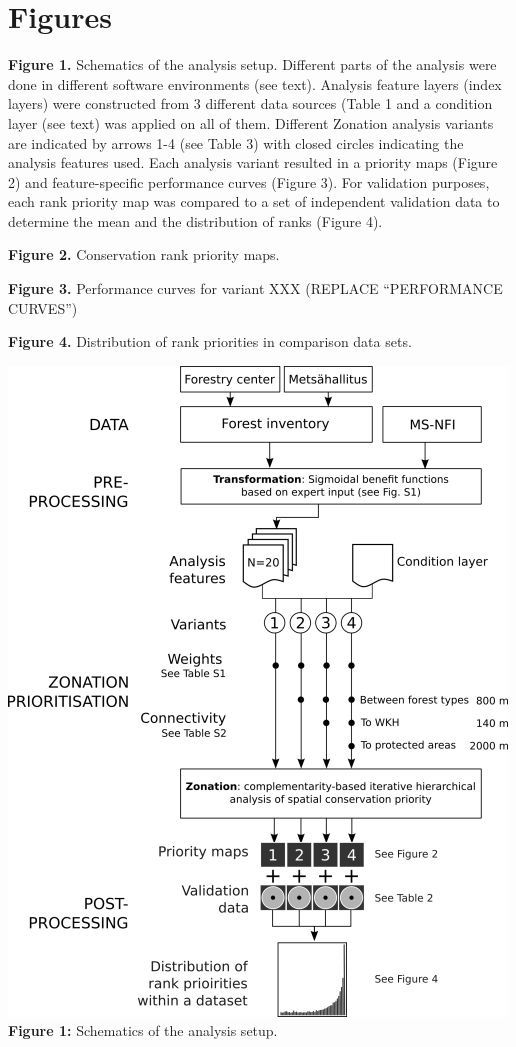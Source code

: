 \section{Figures}

\textbf{Figure 1.} Schematics of the analysis setup. Different parts of
the analysis were done in different software environments (see text).
Analysis feature layers (index layers) were constructed from 3 different
data sources (Table 1 and a condition layer (see text) was applied on
all of them. Different Zonation analysis variants are indicated by
arrows 1-4 (see Table 3) with closed circles indicating the analysis
features used. Each analysis variant resulted in a priority maps (Figure
2) and feature-specific performance curves (Figure 3). For validation
purposes, each rank priority map was compared to a set of independent
validation data to determine the mean and the distribution of ranks
(Figure 4).

\textbf{Figure 2.} Conservation rank priority maps.

\textbf{Figure 3.} Performance curves for variant XXX (REPLACE
``PERFORMANCE CURVES'')

\textbf{Figure 4.} Distribution of rank priorities in comparison data
sets.

\includegraphics{figs/Fig1_w500.png}\\\textbf{Figure 1:} Schematics of
the analysis setup.

